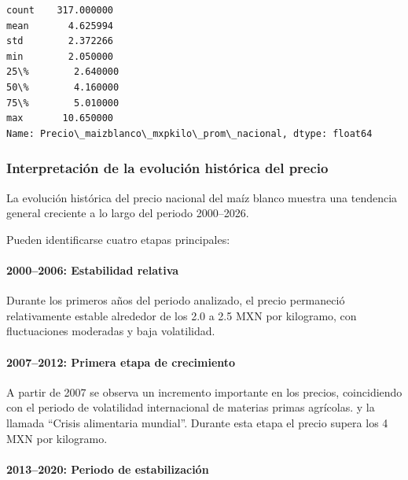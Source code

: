 \documentclass[11pt]{article}
\makeatletter
\newcommand{\boxspacing}{\kern\kvtcb@left@rule\kern\kvtcb@boxsep}
\newcommand{\prompt}[4]{
        {\ttfamily\llap{{\color{#2}[#3]:\hspace{3pt}#4}}\vspace{-\baselineskip}}
    }
\makeatother
\begin{document}
            \begin{tcolorbox}[breakable, size=fbox, boxrule=.5pt, pad at break*=1mm, opacityfill=0]
\prompt{Out}{outcolor}{19}{\boxspacing}
\begin{Verbatim}[commandchars=\\\{\}]
count    317.000000
mean       4.625994
std        2.372266
min        2.050000
25\%        2.640000
50\%        4.160000
75\%        5.010000
max       10.650000
Name: Precio\_maizblanco\_mxpkilo\_prom\_nacional, dtype: float64
\end{Verbatim}
\end{tcolorbox}
        
    \hypertarget{interpretaciuxf3n-de-la-evoluciuxf3n-histuxf3rica-del-precio}{%
\subsubsection{Interpretación de la evolución histórica del
precio}\label{interpretaciuxf3n-de-la-evoluciuxf3n-histuxf3rica-del-precio}}

La evolución histórica del precio nacional del maíz blanco muestra una
tendencia general creciente a lo largo del periodo 2000--2026.

Pueden identificarse cuatro etapas principales:

\hypertarget{estabilidad-relativa}{%
\paragraph{2000--2006: Estabilidad
relativa}\label{estabilidad-relativa}}

Durante los primeros años del periodo analizado, el precio permaneció
relativamente estable alrededor de los 2.0 a 2.5 MXN por kilogramo, con
fluctuaciones moderadas y baja volatilidad.

\hypertarget{primera-etapa-de-crecimiento}{%
\paragraph{2007--2012: Primera etapa de
crecimiento}\label{primera-etapa-de-crecimiento}}

A partir de 2007 se observa un incremento importante en los precios,
coincidiendo con el periodo de volatilidad internacional de materias
primas agrícolas. y la llamada ``Crisis alimentaria mundial''. Durante
esta etapa el precio supera los 4 MXN por kilogramo.

\hypertarget{periodo-de-estabilizaciuxf3n}{%
\paragraph{2013--2020: Periodo de
estabilización}\label{periodo-de-estabilizaciuxf3n}}
\end{document}
